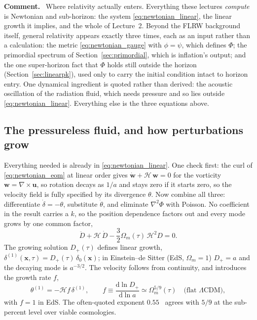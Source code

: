 \documentclass[a4paper,11pt]{article}
\newcommand{\vx}{\bm{x}}
\newcommand{\vu}{\bm{u}}
\def\cH{\mathcal{H}}
\newcommand{\dd}{\mathrm{d}}
\def\lcdm{$\Lambda$CDM}
\def\Om{\Omega_m}
\numberwithin{equation}{section}
\newenvironment{remark}
  {\par\medskip\noindent\begingroup\small\color{ForestGreen!60!black}\textbf{Comment.}\ }
  {\endgroup\par\medskip}
\begin{document}
\begin{remark}
Where relativity actually enters. Everything these lectures \emph{compute} is
Newtonian and sub-horizon: the system \eqref{eq:newtonian_linear}, the linear
growth it implies, and the whole of Lecture~2. Beyond the FLRW background
itself, general relativity appears exactly three times, each as an input rather
than a calculation: the metric \eqref{eq:newtonian_gauge} with $\phi = \psi$,
which defines $\Phi$; the primordial spectrum of Section~\ref{sec:primordial},
which is inflation's output; and the one super-horizon fact that $\Phi$ holds
still outside the horizon (Section~\ref{sec:linearpk}), used only to carry the
initial condition intact to horizon entry. One dynamical ingredient is quoted
rather than derived: the acoustic oscillation of the radiation fluid, which
needs pressure and so lies outside \eqref{eq:newtonian_linear}. Everything else
is the three equations above.
\end{remark}

\subsection{The pressureless fluid, and how perturbations grow}
\label{sec:vlasov}

Everything needed is already in \eqref{eq:newtonian_linear}. One check first:
the curl of \eqref{eq:newtonian_eom} at linear order gives
$\dot{\bm{w}} + \cH\,\bm{w} = 0$ for the vorticity $\bm{w} = \nabla\times\vu$,
so rotation decays as $1/a$ and stays zero if it starts zero, so the velocity field is fully specified by its divergence $\theta$. Now combine all three:
differentiate $\dot\delta = -\theta$, substitute $\dot\theta$, and eliminate
$\nabla^2\Phi$ with Poisson. No coefficient in the result carries a $k$, so the
position dependence factors out and every mode grows by one common factor,
\begin{equation}
\ddot D + \cH\,\dot D - \frac{3}{2}\Om(\tau)\,\cH^2 D = 0 .
\label{eq:growth}
\end{equation}
The growing solution $D_+(\tau)$ defines linear growth, $\delta^{(1)}(\vx,\tau) = D_+(\tau)\,\delta_0(\vx)$; in Einstein--de Sitter (EdS, $\Om = 1$) $D_+ = a$ and the decaying mode is $a^{-3/2}$. The velocity follows from continuity, and introduces the growth rate $f$,
\begin{equation}
\theta^{(1)} = -\cH f\,\delta^{(1)},
\qquad
f \equiv \frac{\dd\ln D_+}{\dd\ln a}
\simeq \Om^{5/9}(\tau) \quad\text{(flat \lcdm)} ,
\label{eq:growth_rate}
\end{equation}
with $f = 1$ in EdS. The often-quoted exponent $0.55$~\cite{Linder2005} agrees
with $5/9$ at the sub-percent level over viable cosmologies.
\end{document}
